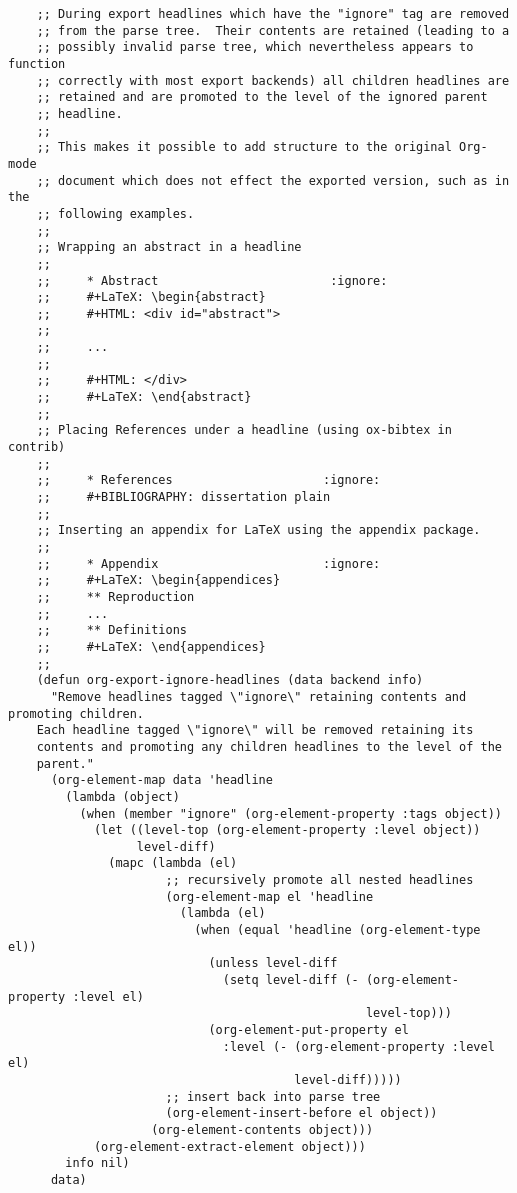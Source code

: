 \documentclass[11pt]{article}
\begin{document}
\begin{verbatim}
    ;; During export headlines which have the "ignore" tag are removed
    ;; from the parse tree.  Their contents are retained (leading to a
    ;; possibly invalid parse tree, which nevertheless appears to function
    ;; correctly with most export backends) all children headlines are
    ;; retained and are promoted to the level of the ignored parent
    ;; headline.
    ;;
    ;; This makes it possible to add structure to the original Org-mode
    ;; document which does not effect the exported version, such as in the
    ;; following examples.
    ;;
    ;; Wrapping an abstract in a headline
    ;;
    ;;     * Abstract                        :ignore:
    ;;     #+LaTeX: \begin{abstract}
    ;;     #+HTML: <div id="abstract">
    ;;
    ;;     ...
    ;;
    ;;     #+HTML: </div>
    ;;     #+LaTeX: \end{abstract}
    ;;
    ;; Placing References under a headline (using ox-bibtex in contrib)
    ;;
    ;;     * References                     :ignore:
    ;;     #+BIBLIOGRAPHY: dissertation plain
    ;;
    ;; Inserting an appendix for LaTeX using the appendix package.
    ;;
    ;;     * Appendix                       :ignore:
    ;;     #+LaTeX: \begin{appendices}
    ;;     ** Reproduction
    ;;     ...
    ;;     ** Definitions
    ;;     #+LaTeX: \end{appendices}
    ;;
    (defun org-export-ignore-headlines (data backend info)
      "Remove headlines tagged \"ignore\" retaining contents and promoting children.
    Each headline tagged \"ignore\" will be removed retaining its
    contents and promoting any children headlines to the level of the
    parent."
      (org-element-map data 'headline
        (lambda (object)
          (when (member "ignore" (org-element-property :tags object))
            (let ((level-top (org-element-property :level object))
                  level-diff)
              (mapc (lambda (el)
                      ;; recursively promote all nested headlines
                      (org-element-map el 'headline
                        (lambda (el)
                          (when (equal 'headline (org-element-type el))
                            (unless level-diff
                              (setq level-diff (- (org-element-property :level el)
                                                  level-top)))
                            (org-element-put-property el
                              :level (- (org-element-property :level el)
                                        level-diff)))))
                      ;; insert back into parse tree
                      (org-element-insert-before el object))
                    (org-element-contents object)))
            (org-element-extract-element object)))
        info nil)
      data)


\end{verbatim}
\end{document}
